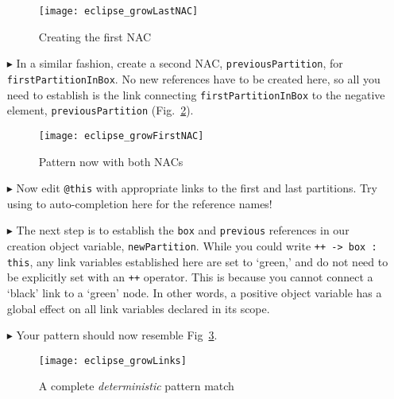 \begin{itemize}
\begin{figure}[htbp]
\begin{center}
  \texttt{[image: eclipse\_growLastNAC]}
  \caption{Creating the first NAC \update}
  \label{fig:firstNAC}
\end{center}
\end{figure}

\vspace{0.5cm}

\item[$\blacktriangleright$] In a similar fashion, create a second NAC, \texttt{previousPartition}, for \texttt{firstPartitionInBox}. No new references have to
be created here, so all you need to establish is the link connecting \texttt{firstPartitionInBox} to the negative element, \texttt{previousPartition}
(Fig.~\ref{fig:growPatt}).

\begin{figure}[htp]
\begin{center}
  \texttt{[image: eclipse\_growFirstNAC]}
  \caption{Pattern now with both NACs \update}
  \label{fig:growPatt}
\end{center}
\end{figure}

\item[$\blacktriangleright$] Now edit \texttt{@this} with appropriate links to the first and last partitions. Try using to auto-completion here for the
reference names!

\item[$\blacktriangleright$] The next step is to establish the \texttt{box} and \texttt{previous} references in our creation object variable,
\texttt{newPartition}. While you could write \texttt{++ -> box : this}, any link variables established here are set to `green,' and do not need to be explicitly
set with an \texttt{++} operator. This is because you cannot connect a `black' link to a `green' node. In other words, a positive object variable has a global
effect on all link variables declared in its scope.

\item[$\blacktriangleright$] Your pattern should now resemble Fig~\ref{fig:growAllLinks}. 

\begin{figure}[htp]
\begin{center}
  \texttt{[image: eclipse\_growLinks]}
  \caption{A complete \emph{deterministic} pattern match \update}
  \label{fig:growAllLinks}
\end{center}
\end{figure}


\end{itemize}
